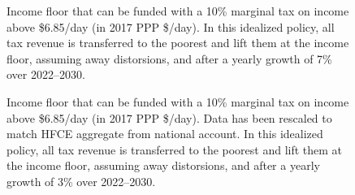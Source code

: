 \documentclass[12pt,english]{article}
\begin{document}
\begin{figure}[!htb]
  \caption[Income floor of 10\% tax above \$6.85/day after 7\% growth.]{Income floor that can be funded with a 10\% marginal tax on income above \$6.85/day (in 2017 PPP \$/day). In this idealized policy, all tax revenue is transferred to the poorest and lift them at the income floor, assuming away distorsions, and after a yearly growth of 7\% over 2022--2030. 
  }\label{fig:demogrant_7__10_very_optimistic}
\end{figure}

\FloatBarrier
\begin{figure}[!htb]
  \caption[Income floor of 10\% tax above \$6.85/day after 3\% growth (HFCE-scaled).]{Income floor that can be funded with a 10\% marginal tax on income above \$6.85/day (in 2017 PPP \$/day). Data has been rescaled to match HFCE aggregate from national account. In this idealized policy, all tax revenue is transferred to the poorest and lift them at the income floor, assuming away distorsions, and after a yearly growth of 3\% over 2022--2030. 
  }\label{fig:s_demogrant_7__10}
\end{figure}
\end{document}
